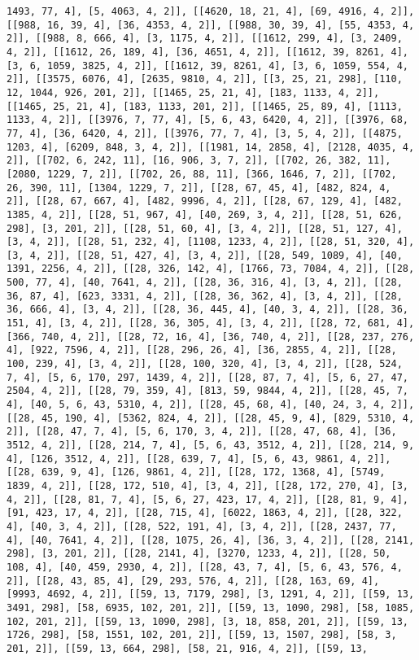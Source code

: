 \documentclass[12pt,fleqn]{article}\usepackage{../../common}
\begin{document}
\begin{verbatim}
1493, 77, 4], [5, 4063, 4, 2]], [[4620, 18, 21, 4], [69, 4916, 4, 2]], [[988, 16, 39, 4], [36, 4353, 4, 2]], [[988, 30, 39, 4], [55, 4353, 4, 2]], [[988, 8, 666, 4], [3, 1175, 4, 2]], [[1612, 299, 4], [3, 2409, 4, 2]], [[1612, 26, 189, 4], [36, 4651, 4, 2]], [[1612, 39, 8261, 4], [3, 6, 1059, 3825, 4, 2]], [[1612, 39, 8261, 4], [3, 6, 1059, 554, 4, 2]], [[3575, 6076, 4], [2635, 9810, 4, 2]], [[3, 25, 21, 298], [110, 12, 1044, 926, 201, 2]], [[1465, 25, 21, 4], [183, 1133, 4, 2]], [[1465, 25, 21, 4], [183, 1133, 201, 2]], [[1465, 25, 89, 4], [1113, 1133, 4, 2]], [[3976, 7, 77, 4], [5, 6, 43, 6420, 4, 2]], [[3976, 68, 77, 4], [36, 6420, 4, 2]], [[3976, 77, 7, 4], [3, 5, 4, 2]], [[4875, 1203, 4], [6209, 848, 3, 4, 2]], [[1981, 14, 2858, 4], [2128, 4035, 4, 2]], [[702, 6, 242, 11], [16, 906, 3, 7, 2]], [[702, 26, 382, 11], [2080, 1229, 7, 2]], [[702, 26, 88, 11], [366, 1646, 7, 2]], [[702, 26, 390, 11], [1304, 1229, 7, 2]], [[28, 67, 45, 4], [482, 824, 4, 2]], [[28, 67, 667, 4], [482, 9996, 4, 2]], [[28, 67, 129, 4], [482, 1385, 4, 2]], [[28, 51, 967, 4], [40, 269, 3, 4, 2]], [[28, 51, 626, 298], [3, 201, 2]], [[28, 51, 60, 4], [3, 4, 2]], [[28, 51, 127, 4], [3, 4, 2]], [[28, 51, 232, 4], [1108, 1233, 4, 2]], [[28, 51, 320, 4], [3, 4, 2]], [[28, 51, 427, 4], [3, 4, 2]], [[28, 549, 1089, 4], [40, 1391, 2256, 4, 2]], [[28, 326, 142, 4], [1766, 73, 7084, 4, 2]], [[28, 500, 77, 4], [40, 7641, 4, 2]], [[28, 36, 316, 4], [3, 4, 2]], [[28, 36, 87, 4], [623, 3331, 4, 2]], [[28, 36, 362, 4], [3, 4, 2]], [[28, 36, 666, 4], [3, 4, 2]], [[28, 36, 445, 4], [40, 3, 4, 2]], [[28, 36, 151, 4], [3, 4, 2]], [[28, 36, 305, 4], [3, 4, 2]], [[28, 72, 681, 4], [366, 740, 4, 2]], [[28, 72, 16, 4], [36, 740, 4, 2]], [[28, 237, 276, 4], [922, 7596, 4, 2]], [[28, 296, 26, 4], [36, 2855, 4, 2]], [[28, 100, 239, 4], [3, 4, 2]], [[28, 100, 320, 4], [3, 4, 2]], [[28, 524, 7, 4], [5, 6, 170, 297, 1439, 4, 2]], [[28, 87, 7, 4], [5, 6, 27, 47, 2504, 4, 2]], [[28, 79, 359, 4], [813, 59, 9844, 4, 2]], [[28, 45, 7, 4], [40, 5, 6, 43, 5310, 4, 2]], [[28, 45, 68, 4], [40, 24, 3, 4, 2]], [[28, 45, 190, 4], [5362, 824, 4, 2]], [[28, 45, 9, 4], [829, 5310, 4, 2]], [[28, 47, 7, 4], [5, 6, 170, 3, 4, 2]], [[28, 47, 68, 4], [36, 3512, 4, 2]], [[28, 214, 7, 4], [5, 6, 43, 3512, 4, 2]], [[28, 214, 9, 4], [126, 3512, 4, 2]], [[28, 639, 7, 4], [5, 6, 43, 9861, 4, 2]], [[28, 639, 9, 4], [126, 9861, 4, 2]], [[28, 172, 1368, 4], [5749, 1839, 4, 2]], [[28, 172, 510, 4], [3, 4, 2]], [[28, 172, 270, 4], [3, 4, 2]], [[28, 81, 7, 4], [5, 6, 27, 423, 17, 4, 2]], [[28, 81, 9, 4], [91, 423, 17, 4, 2]], [[28, 715, 4], [6022, 1863, 4, 2]], [[28, 322, 4], [40, 3, 4, 2]], [[28, 522, 191, 4], [3, 4, 2]], [[28, 2437, 77, 4], [40, 7641, 4, 2]], [[28, 1075, 26, 4], [36, 3, 4, 2]], [[28, 2141, 298], [3, 201, 2]], [[28, 2141, 4], [3270, 1233, 4, 2]], [[28, 50, 108, 4], [40, 459, 2930, 4, 2]], [[28, 43, 7, 4], [5, 6, 43, 576, 4, 2]], [[28, 43, 85, 4], [29, 293, 576, 4, 2]], [[28, 163, 69, 4], [9993, 4692, 4, 2]], [[59, 13, 7179, 298], [3, 1291, 4, 2]], [[59, 13, 3491, 298], [58, 6935, 102, 201, 2]], [[59, 13, 1090, 298], [58, 1085, 102, 201, 2]], [[59, 13, 1090, 298], [3, 18, 858, 201, 2]], [[59, 13, 1726, 298], [58, 1551, 102, 201, 2]], [[59, 13, 1507, 298], [58, 3, 201, 2]], [[59, 13, 664, 298], [58, 21, 916, 4, 2]], [[59, 13, 
\end{verbatim}
\end{document}
